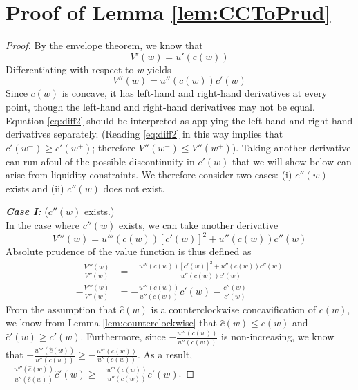 \documentclass[titlepage]{\econtex}
\begin{document}
  \section{Proof of Lemma \ref{lem:CCToPrud}} \label{app:CCToPrud}
  \begin{proof}
    By the envelope theorem, we know that 
    \[ V'(w) = u'(c(w))\]
    Differentiating with respect to $w$ yields
    \begin{equation}\label{eq:diff2}
      V''(w) = u''(c(w))c'(w)
    \end{equation}
    Since $c(w)$ is concave, it has left-hand and right-hand derivatives at every point, though the left-hand and right-hand derivatives may not be equal. Equation \eqref{eq:diff2} should be interpreted as applying the left-hand and right-hand derivatives separately. (Reading \eqref{eq:diff2} in this way implies that $c'(w^-) \geq c'(w^+)$; therefore $V''(w^-) \leq V''(w^+)$). Taking another derivative can run afoul of the possible discontinuity in $c'(w)$ that we will show below can arise from liquidity constraints. We therefore consider two cases: (i) $c''(w)$ exists and (ii) $c''(w)$ does not exist. 
    
    \bigskip
    \noindent \textbf{\textit{Case I:}} ($c''(w)$ exists.)\\
    In the case where $c''(w)$ exists, we can take another derivative
    \[V'''(w) = u'''(c(w))[c'(w)]^2 + u''(c(w))c''(w)\]
    Absolute prudence of the value function is thus defined as
    \begin{align}-\frac{V'''(w)}{V''(w)} &= -\frac{u'''(c(w))[c'(w)]^2 + u''(c(w))c''(w)}{u''(c(w))c'(w)} \nonumber \\
      -\frac{V'''(w)}{V''(w)} &= -\frac{u'''(c(w))}{u''(c(w))}c'(w) - \frac{c''(w)}{c'(w)}\label{eq:absprudence}\end{align}
    From the assumption that $\hat{c}(w)$ is a counterclockwise concavification of $c(w)$, we know from Lemma \ref{lem:counterclockwise} that  $\hat{c}(w) \leq c(w)$ and $\hat{c}'(w) \geq c'(w)$. Furthermore, since $-\frac{u'''(c(w))}{u''(c(w))}$ is non-increasing, we know that $-\frac{u'''(\hat{c}(w))}{u''(\hat{c}(w))} \geq -\frac{u'''(c(w))}{u''(c(w))}$. As a result, $-\frac{u'''(\hat{c}(w))}{u''(\hat{c}(w))}\hat{c}'(w) \geq -\frac{u'''(c(w))}{u''(c(w))}c'(w)$. 
    

\end{proof}
\end{document}
